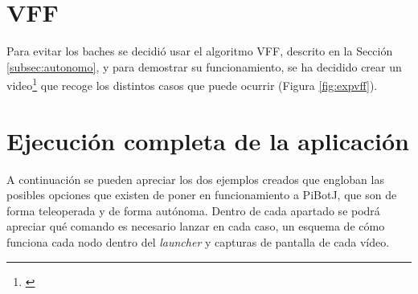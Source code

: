 




\section{VFF}
\label{sec:expvff}
Para evitar los baches se decidió usar el algoritmo \ac{VFF}, descrito en la Sección \ref{subsec:autonomo}, y para demostrar su funcionamiento, se ha decidido crear un video\footnote{\url{}} que recoge los distintos casos que puede ocurrir (Figura \ref{fig:expvff}).  




\section{Ejecución completa de la aplicación}
\label{sec:expcompleto}
A continuación se pueden apreciar los dos ejemplos creados que engloban las posibles opciones que existen de poner en funcionamiento a PiBotJ, que son de forma teleoperada y de forma autónoma. Dentro de cada apartado se podrá apreciar qué comando es necesario lanzar en cada caso, un esquema de cómo funciona cada nodo dentro del \textit{launcher} y capturas de pantalla de cada vídeo.

